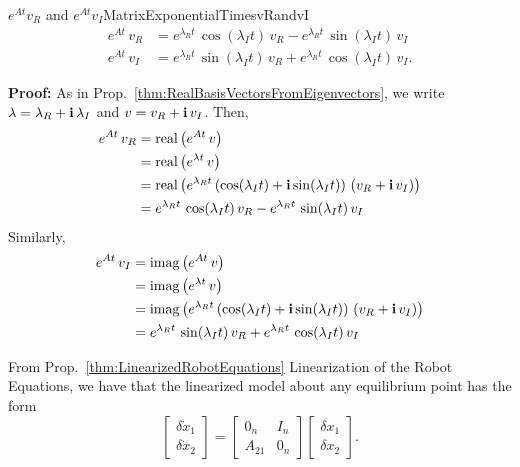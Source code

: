 \begin{propColor}{$e^{At} v_R$ and $e^{At} v_I$}{MatrixExponentialTimesvRandvI}
\begin{equation}
\label{eq:KeyToRealJordanFormMatrixExponential}
    \begin{aligned}
        e^{At} \, v_R &= e^{\lambda_R t }\, \cos(\lambda_I t) \, v_R -  e^{\lambda_R t} \, \sin(\lambda_I t) \,v_I \\
        e^{At} \, v_I &=  e^{\lambda_R t }\, \sin(\lambda_I t) \, v_R +  e^{\lambda_R t} \, \cos(\lambda_I t) \,v_I.
    \end{aligned}
\end{equation}
    
\end{propColor}
\textbf{Proof:} As in Prop.~\ref{thm:RealBasisVectorsFromEigenvectors}, we write $\lambda = \lambda_R + \mathop{\bm{\mathrm i}} \lambda_I$ and $v = v_R + \mathop{\bm{\mathrm i}} v_I$. Then, 
\begin{align*}
     e^{At} \, v_R & = {\rm real}\left( e^{At}  \, v\right)  \\
     &= {\rm real}\left( e^{\lambda t}  \, v\right) \\
     &= {\rm real}\left( e^{\lambda_R t} \left( \cos(\lambda_I t) + \mathop{\bm{\mathrm i}}  \sin(\lambda_I t)\right)  \, \left( v_R + \mathop{\bm{\mathrm i}} v_I
 \right) \right) \\
 & = e^{\lambda_R t }\, \cos(\lambda_I t) \, v_R -  e^{\lambda_R t} \, \sin(\lambda_I t) \,v_I
\end{align*}
Similarly,
\begin{align*}
     e^{At} \, v_I & = {\rm imag}\left( e^{At}  \, v\right)  \\
     &= {\rm imag}\left( e^{\lambda t}  \, v\right) \\
     &= {\rm imag}\left( e^{\lambda_R t} \left( \cos(\lambda_I t) + \mathop{\bm{\mathrm i}}  \sin(\lambda_I t)\right)  \, \left( v_R + \mathop{\bm{\mathrm i}} v_I
 \right) \right) \\
 & = e^{\lambda_R t }\, \sin(\lambda_I t) \, v_R +  e^{\lambda_R t} \, \cos(\lambda_I t) \,v_I
\end{align*}


\Qed
 

 \bigskip

 From Prop.~\ref{thm:LinearizedRobotEquations} Linearization of the Robot Equations, we have that the linearized model about any equilibrium point has the form
\begin{equation}
    \label{eq:RobotEqnLinearizedSecondOrderV03}
  \left[ \begin{array}{c} \delta \dot{x}_1 \\ \delta  \dot{x}_2 \end{array} \right] = \left[ \begin{array}{cc} 0_n & I_n \\ A_{21} & 0_n \end{array} \right] \left[ \begin{array}{c} \delta {x}_1 \\ \delta {x}_2 \end{array} \right].
\end{equation}

